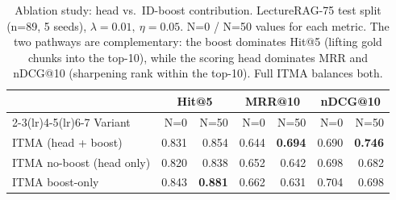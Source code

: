 \begin{table}[!htbp]
\centering
\small
\caption{Ablation study: head vs.\ ID-boost contribution.
LectureRAG-75 test split (n=89, 5 seeds), $\lambda{=}0.01,~\eta{=}0.05$.
N=0 / N=50 values for each metric.  The two pathways are complementary:
the boost dominates Hit@5 (lifting gold chunks into the top-10), while the
scoring head dominates MRR and nDCG@10 (sharpening rank within the
top-10).  Full ITMA balances both.}
\label{tab:ablation}
\begin{tabular}{lrrrrrr}
\toprule
                          & \multicolumn{2}{c}{Hit@5} & \multicolumn{2}{c}{MRR@10} & \multicolumn{2}{c}{nDCG@10} \\
\cmidrule(lr){2-3}\cmidrule(lr){4-5}\cmidrule(lr){6-7}
Variant                   & N=0 & N=50 & N=0 & N=50 & N=0 & N=50 \\
\midrule
ITMA (head + boost)       & 0.831 & 0.854 & 0.644 & \textbf{0.694} & 0.690 & \textbf{0.746} \\
ITMA no-boost (head only) & 0.820 & 0.838 & 0.652 & 0.642 & 0.698 & 0.682 \\
ITMA boost-only           & 0.843 & \textbf{0.881} & 0.662 & 0.631 & 0.704 & 0.698 \\
\bottomrule
\end{tabular}
\end{table}
